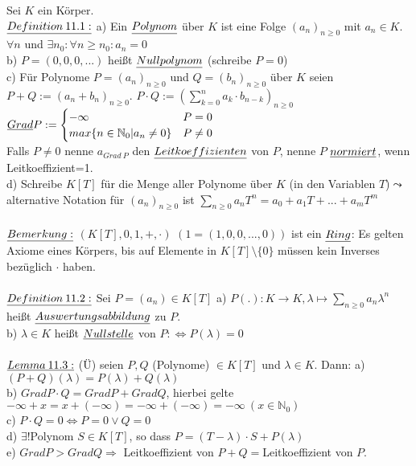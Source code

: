 \documentclass[fleqn, a4paper, 11pt]{article}
\begin{document}
Sei $K$ ein K\"orper.\\
$\uline{Definition\:11.1:}$ a) Ein $\uline{Polynom}$ \"uber $K$ ist eine Folge $(a_n)_{n\geq 0}$ mit $a_n\in K$. $\forall n$ und $\exists n_0 :\forall n\geq n_0: a_n=0$\\
b) $P=(0,0,0,...)$ hei\ss{}t $\uline{Nullpolynom}$ (schreibe $P=0$)\\
c) F\"ur Polynome $P=(a_n)_{n\geq 0}$ und $Q=(b_n)_{n\geq 0}$ \"uber $K$ seien $P+Q:=(a_n +b_n)_{n\geq 0}$. $P\cdot Q:=(\sum\limits_{k=0}^n a_k\cdot b_{n-k})_{n\geq 0}$\\
$\uline{Grad}P:=\begin{cases}
	-\infty & P=0 \\
	max\{n\in\mathbb{N}_0 | a_n\neq 0\} & P\neq 0
\end{cases}$\\
Falls $P\neq 0$ nenne $a_{Grad\:P}$ den $\uline{Leitkoeffizienten}$ von $P$, nenne $P$ $\uline{normiert}$, wenn Leitkoeffizient=1.\\
d) Schreibe $K[T]$ f\"ur die Menge aller Polynome \"uber $K$ (in den Variablen $T$)$\leadsto$ alternative Notation f\"ur $(a_n)_{n\geq 0}$ ist $\sum\limits_{n\geq 0} a_n T^n =a_0 + a_1 T+...+a_m T^m$\\
\\
$\uline{Bemerkung:}$ $(K[T],0,1,+,\cdot)$ $(1=(1,0,0,...,0))$ ist ein $\uline{Ring}$: Es gelten Axiome eines K\"orpers, bis auf Elemente in $K[T]\setminus\{0\}$ m\"ussen kein Inverses bez\"uglich $\cdot$ haben.\\
\\
$\uline{Definition\:11.2:}$ Sei $P=(a_n)\in K[T]$ a) $P(.):K\rightarrow K,\lambda\mapsto\sum\limits_{n\geq 0} a_n\lambda^n$ hei\ss{}t $\uline{Auswertungsabbildung}$ zu $P$.\\
b) $\lambda\in K$ hei\ss{}t $\uline{Nullstelle}$ von $P:\Leftrightarrow P(\lambda)=0$\\
\\
$\uline{Lemma\:11.3:}$ (\"U) seien $P,Q$ (Polynome) $\in K[T]$ und $\lambda\in K$. Dann: a) $(P+Q)(\lambda)=P(\lambda)+Q(\lambda)$\\
b) $Grad P\cdot Q=Grad P+Grad Q$, hierbei gelte $-\infty +x=x+(-\infty)=-\infty +(-\infty)=-\infty\:(x\in \mathbb{N}_0)$\\
c) $P\cdot Q=0\Leftrightarrow P=0 \vee Q=0$\\
d) $\exists !$Polynom $S\in K[T]$, so dass $P=(T-\lambda)\cdot S+P(\lambda)$\\
e) $Grad P>Grad Q\Rightarrow$ Leitkoeffizient von $P+Q=$Leitkoeffizient von $P$.\\
\end{document}

